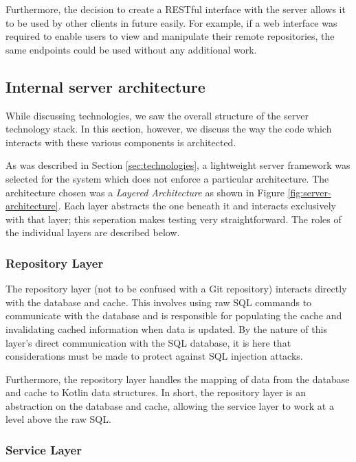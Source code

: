 Furthermore, the decision to create a RESTful interface with the server allows it to be used by other clients in future easily. For example, if a web interface was required to enable users to view and manipulate their remote repositories, the same endpoints could be used without any additional work.

\subsection{Internal server architecture}\label{sec:server-architecture}

While discussing technologies, we saw the overall structure of the server technology stack. In this section, however, we discuss the way the code which interacts with these various components is architected.

As was described in Section \ref{sec:technologies}, a lightweight server framework was selected for the system which does not enforce a particular architecture. The architecture chosen was a \emph{Layered Architecture} as shown in Figure \ref{fig:server-architecture}. Each layer abstracts the one beneath it and interacts exclusively with that layer; this seperation makes testing very straightforward. The roles of the individual layers are described below.


\subsubsection{Repository Layer}

The repository layer (not to be confused with a Git repository) interacts directly with the database and cache. This involves using raw SQL commands to communicate with the database and is responsible for populating the cache and invalidating cached information when data is updated. By the nature of this layer's direct communication with the SQL database, it is here that considerations must be made to protect against SQL injection attacks.

Furthermore, the repository layer handles the mapping of data from the database and cache to Kotlin data structures. In short, the repository layer is an abstraction on the database and cache, allowing the service layer to work at a level above the raw SQL.


\subsubsection{Service Layer}

